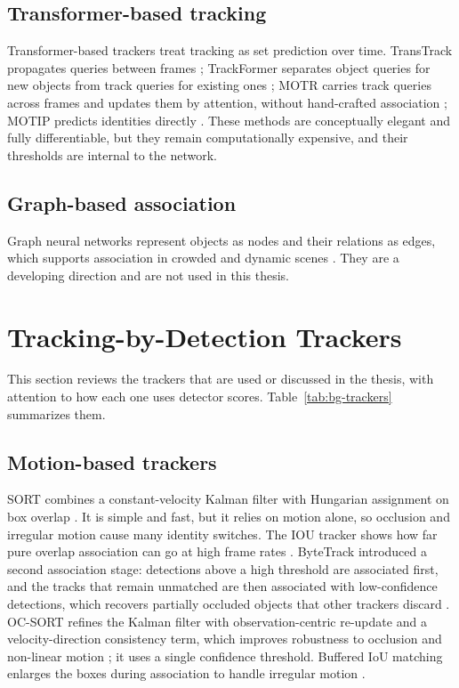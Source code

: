 \subsection{Transformer-based tracking}
Transformer-based trackers treat tracking as set prediction over time. TransTrack propagates queries between frames \cite{sun2020transtrack}; TrackFormer separates object queries for new objects from track queries for existing ones \cite{meinhardt2022trackformer}; MOTR carries track queries across frames and updates them by attention, without hand-crafted association \cite{zeng2022motr}; MOTIP predicts identities directly \cite{gao2025motip}. These methods are conceptually elegant and fully differentiable, but they remain computationally expensive, and their thresholds are internal to the network.

\subsection{Graph-based association}
Graph neural networks represent objects as nodes and their relations as edges, which supports association in crowded and dynamic scenes \cite{li2025motreview}. They are a developing direction and are not used in this thesis.

\section{Tracking-by-Detection Trackers}\label{sec:bg-trackers}
This section reviews the trackers that are used or discussed in the thesis, with attention to how each one uses detector scores. Table~\ref{tab:bg-trackers} summarizes them.

\subsection{Motion-based trackers}
SORT combines a constant-velocity Kalman filter with Hungarian assignment on box overlap \cite{bewley2016sort}. It is simple and fast, but it relies on motion alone, so occlusion and irregular motion cause many identity switches. The IOU tracker shows how far pure overlap association can go at high frame rates \cite{bochinski2017iou}. ByteTrack introduced a second association stage: detections above a high threshold are associated first, and the tracks that remain unmatched are then associated with low-confidence detections, which recovers partially occluded objects that other trackers discard \cite{zhang2022bytetrack}. OC-SORT refines the Kalman filter with observation-centric re-update and a velocity-direction consistency term, which improves robustness to occlusion and non-linear motion \cite{cao2023ocsort}; it uses a single confidence threshold. Buffered IoU matching enlarges the boxes during association to handle irregular motion \cite{yang2023cbiou}.

